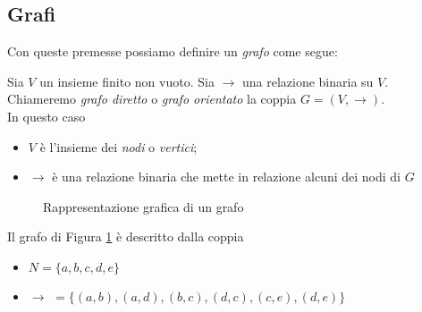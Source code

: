\subsection{Grafi}
Con queste premesse possiamo definire un \emph{grafo} come segue:
\begin{definition}
    Sia $V$ un insieme finito non vuoto. Sia $\to$ una relazione binaria su $V$.\\
    Chiameremo \emph{grafo diretto} o \emph{grafo orientato} la coppia $G = (V, \to)$.\\
    In questo caso
    \begin{itemize}
        \item $V$ è l'insieme dei \emph{nodi} o \emph{vertici};
        \item $\to$ è una relazione binaria che mette in relazione alcuni dei nodi di $G$
    \end{itemize}
\end{definition}
\begin{example}
    \begin{figure}[b]
        \centering
        \caption{Rappresentazione grafica di un grafo}
        \label{fig:graph}
    \end{figure}
    Il grafo di Figura \ref*{fig:graph} è descritto dalla coppia
    \begin{itemize}
        \item $N = \{a,b,c,d,e\}$
        \item $\to \,\,= \{(a,b), (a,d), (b,c), (d,c), (c,e), (d,e)\}$
    \end{itemize}
\end{example}
